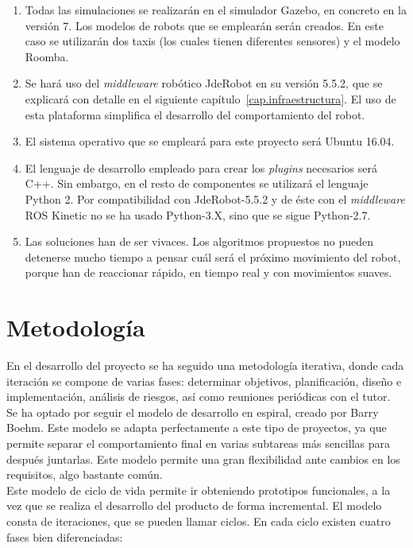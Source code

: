 \begin{enumerate}[1.]
\item Todas las simulaciones se realizarán en el simulador Gazebo, en concreto en la versión 7. Los modelos de robots que se emplearán serán creados. En este caso se utilizarán dos taxis (los cuales tienen diferentes sensores) y el modelo Roomba.
\item Se hará uso del \textit{middleware} robótico JdeRobot en su versión 5.5.2, que se explicará con detalle en el siguiente capítulo~\ref{cap.infraestructura}. El uso de esta plataforma simplifica el desarrollo del comportamiento del robot. 
\item El sistema operativo que se empleará para este proyecto será Ubuntu 16.04.
\item El lenguaje de desarrollo empleado para crear los \textit{plugins} necesarios será C++. Sin embargo, en el resto de componentes se utilizará el lenguaje Python 2. Por compatibilidad con JdeRobot-5.5.2 y de éste con el \textit{middleware} ROS Kinetic no se ha usado Python-3.X, sino que se sigue Python-2.7.
\item Las soluciones han de ser vivaces. Los algoritmos propuestos no pueden detenerse mucho tiempo a pensar cuál será el próximo movimiento del robot, porque han de reaccionar rápido, en tiempo real y con movimientos suaves.
\end{enumerate}

\section{Metodología}
En el desarrollo del proyecto se ha seguido una metodología iterativa, donde cada iteración se compone de varias fases: determinar objetivos, planificación, diseño e implementación, análisis de riesgos, así como reuniones periódicas con el tutor.\\

Se ha optado por seguir el modelo de desarrollo en espiral, creado por Barry Boehm. Este modelo se adapta perfectamente a este tipo de proyectos, ya que permite separar el comportamiento final en varias subtareas más sencillas para después juntarlas. Este modelo permite una gran flexibilidad ante cambios en los requisitos, algo bastante común.\\

Este modelo de ciclo de vida permite ir obteniendo prototipos funcionales, a la vez que se realiza el desarrollo del producto de forma incremental. El modelo consta de iteraciones, que se pueden llamar ciclos. En cada ciclo existen cuatro fases bien diferenciadas:

